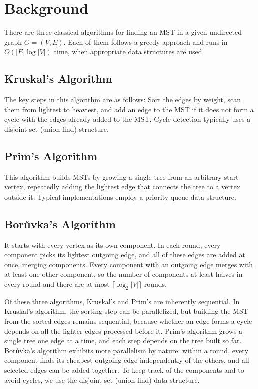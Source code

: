 \documentclass[11pt,a4paper]{article}
\begin{document}
\section*{Background}
There are three classical algorithms for finding an MST in a given undirected graph $G=(V,E)$. Each of them follows a greedy approach and runs in $O(|E|\log|V|)$ time, when appropriate data structures are used.

\subsection*{Kruskal's Algorithm}
The key steps in this algorithm are as follows: Sort the edges by weight, scan them from lightest to heaviest, and add an edge to the MST if it does not form a cycle with the edges already added to the MST. Cycle detection typically uses a disjoint-set (union-find) structure.

\subsection*{Prim's Algorithm}
This algorithm builds MSTs by growing a single tree from an arbitrary start vertex, repeatedly adding the lightest edge that connects the tree to a vertex outside it. Typical implementations employ a priority queue data structure.

\subsection*{Bor\r{u}vka's Algorithm}
It starts with every vertex as its own component. In each round, every component picks its lightest outgoing edge, and all of these edges are added at once, merging components. Every component with an outgoing edge merges with at least one other component, so the number of components at least halves in every round and there are at most $\lceil\log_2|V|\rceil$ rounds.

Of these three algorithms, Kruskal's and Prim's are inherently sequential. In Kruskal's algorithm, the sorting step can be parallelized, but building the MST from the sorted edges remains sequential, because whether an edge forms a cycle depends on all the lighter edges processed before it. Prim's algorithm grows a single tree one edge at a time, and each step depends on the tree built so far. Bor\r{u}vka's algorithm exhibits more parallelism by nature: within a round, every component finds its cheapest outgoing edge independently of the others, and all selected edges can be added together. To keep track of the components and to avoid cycles, we use the disjoint-set (union-find) data structure.
\end{document}
